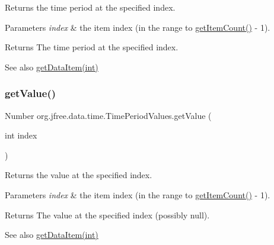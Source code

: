 Returns the time period at the specified index.


\begin{DoxyParams}{Parameters}
{\em index} & the item index (in the range {} to {\ttfamily \mbox{\hyperlink{classorg_1_1jfree_1_1data_1_1time_1_1_time_period_values_a45a779236ab4207245c09d8d85592e77}{get\+Item\+Count()}} -\/ 1}).\\
\hline
\end{DoxyParams}
\begin{DoxyReturn}{Returns}
The time period at the specified index.
\end{DoxyReturn}
\begin{DoxySeeAlso}{See also}
\mbox{\hyperlink{classorg_1_1jfree_1_1data_1_1time_1_1_time_period_values_acfb6760194a12e035ba7fe02d45dd099}{get\+Data\+Item(int)}} 
\end{DoxySeeAlso}
\mbox{\label{classorg_1_1jfree_1_1data_1_1time_1_1_time_period_values_ac4d580867da852cbade6c44e67bb4e22}} 
\subsubsection{\texorpdfstring{get\+Value()}{getValue()}}
{\footnotesize\ttfamily Number org.\+jfree.\+data.\+time.\+Time\+Period\+Values.\+get\+Value (\begin{DoxyParamCaption}\item[{int}]{index }\end{DoxyParamCaption})}

Returns the value at the specified index.


\begin{DoxyParams}{Parameters}
{\em index} & the item index (in the range {} to {\ttfamily \mbox{\hyperlink{classorg_1_1jfree_1_1data_1_1time_1_1_time_period_values_a45a779236ab4207245c09d8d85592e77}{get\+Item\+Count()}} -\/ 1}).\\
\hline
\end{DoxyParams}
\begin{DoxyReturn}{Returns}
The value at the specified index (possibly {\ttfamily null}).
\end{DoxyReturn}
\begin{DoxySeeAlso}{See also}
\mbox{\hyperlink{classorg_1_1jfree_1_1data_1_1time_1_1_time_period_values_acfb6760194a12e035ba7fe02d45dd099}{get\+Data\+Item(int)}} 
\end{DoxySeeAlso}
\mbox{\label{classorg_1_1jfree_1_1data_1_1time_1_1_time_period_values_a9aa9b0655bbbf7e53c9e76c33c7c56a3}} 

